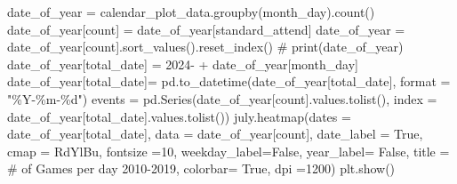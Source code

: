 \documentclass[
  letterpaper,
  DIV=11,
  numbers=noendperiod]{scrartcl}
\newenvironment{Shaded}{\begin{snugshade}}{\end{snugshade}}
\newcommand{\BuiltInTok}[1]{\textcolor[rgb]{0.00,0.23,0.31}{#1}}
\newcommand{\CommentTok}[1]{\textcolor[rgb]{0.37,0.37,0.37}{#1}}
\newcommand{\DecValTok}[1]{\textcolor[rgb]{0.68,0.00,0.00}{#1}}
\newcommand{\NormalTok}[1]{\textcolor[rgb]{0.00,0.23,0.31}{#1}}
\newcommand{\OperatorTok}[1]{\textcolor[rgb]{0.37,0.37,0.37}{#1}}
\newcommand{\SpecialCharTok}[1]{\textcolor[rgb]{0.37,0.37,0.37}{#1}}
\newcommand{\StringTok}[1]{\textcolor[rgb]{0.13,0.47,0.30}{#1}}
\newcommand{\VariableTok}[1]{\textcolor[rgb]{0.07,0.07,0.07}{#1}}
\begin{document}
\begin{Shaded}
\begin{Highlighting}[]
\NormalTok{date\_of\_year }\OperatorTok{=}\NormalTok{ calendar\_plot\_data.groupby(}\StringTok{\textquotesingle{}month\_day\textquotesingle{}}\NormalTok{).count()}
\NormalTok{date\_of\_year[}\StringTok{\textquotesingle{}count\textquotesingle{}}\NormalTok{] }\OperatorTok{=}\NormalTok{ date\_of\_year[}\StringTok{\textquotesingle{}standard\_attend\textquotesingle{}}\NormalTok{]}
\NormalTok{date\_of\_year }\OperatorTok{=}\NormalTok{ date\_of\_year[}\StringTok{\textquotesingle{}count\textquotesingle{}}\NormalTok{].sort\_values().reset\_index()}
\CommentTok{\# print(date\_of\_year)}
\NormalTok{date\_of\_year[}\StringTok{\textquotesingle{}total\_date\textquotesingle{}}\NormalTok{] }\OperatorTok{=} \StringTok{\textquotesingle{}2024{-}\textquotesingle{}} \OperatorTok{+}\NormalTok{ date\_of\_year[}\StringTok{\textquotesingle{}month\_day\textquotesingle{}}\NormalTok{]}
\NormalTok{date\_of\_year[}\StringTok{\textquotesingle{}total\_date\textquotesingle{}}\NormalTok{]}\OperatorTok{=}\NormalTok{ pd.to\_datetime(date\_of\_year[}\StringTok{\textquotesingle{}total\_date\textquotesingle{}}\NormalTok{], }\BuiltInTok{format} \OperatorTok{=} \StringTok{"\%Y{-}\%m{-}}\SpecialCharTok{\%d}\StringTok{"}\NormalTok{)}
\NormalTok{events }\OperatorTok{=}\NormalTok{ pd.Series(date\_of\_year[}\StringTok{\textquotesingle{}count\textquotesingle{}}\NormalTok{].values.tolist(), index }\OperatorTok{=}\NormalTok{ date\_of\_year[}\StringTok{\textquotesingle{}total\_date\textquotesingle{}}\NormalTok{].values.tolist())}
\NormalTok{july.heatmap(dates }\OperatorTok{=}\NormalTok{ date\_of\_year[}\StringTok{\textquotesingle{}total\_date\textquotesingle{}}\NormalTok{], data }\OperatorTok{=}\NormalTok{ date\_of\_year[}\StringTok{\textquotesingle{}count\textquotesingle{}}\NormalTok{],  date\_label }\OperatorTok{=} \VariableTok{True}\NormalTok{, cmap }\OperatorTok{=} \StringTok{\textquotesingle{}RdYlBu\textquotesingle{}}\NormalTok{, fontsize }\OperatorTok{=}\DecValTok{10}\NormalTok{, weekday\_label}\OperatorTok{=}\VariableTok{False}\NormalTok{, year\_label}\OperatorTok{=} \VariableTok{False}\NormalTok{, title }\OperatorTok{=} \StringTok{\textquotesingle{}\# of Games per day 2010{-}2019\textquotesingle{}}\NormalTok{, colorbar}\OperatorTok{=} \VariableTok{True}\NormalTok{, dpi }\OperatorTok{=}\DecValTok{1200}\NormalTok{)}
\NormalTok{plt.show()}
\end{Highlighting}
\end{Shaded}
\end{document}
